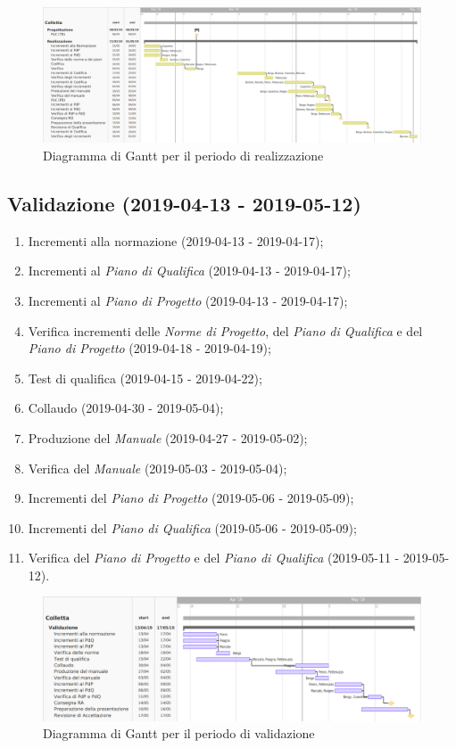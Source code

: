 	\newpage
	\begin{figure}[!hbtp]
		\centering
		\includegraphics[scale=0.5, angle=90]{images/ganttreal.png}
		\caption{Diagramma di Gantt per il periodo di realizzazione}
	\end{figure}
	
	\newpage
	
	\subsection{Validazione (2019-04-13 - 2019-05-12)}
		\begin{enumerate}[label= 5.\arabic*)]
			\item Incrementi alla normazione (2019-04-13 - 2019-04-17);
			\item Incrementi al \textit{Piano di Qualifica} (2019-04-13 - 2019-04-17);
			\item Incrementi al \textit{Piano di Progetto} (2019-04-13 - 2019-04-17);
			\item Verifica incrementi delle \textit{Norme di Progetto}, del \textit{Piano di Qualifica} e del \textit{Piano di Progetto} (2019-04-18 - 2019-04-19);
			\item Test di qualifica (2019-04-15 - 2019-04-22);
			\item Collaudo (2019-04-30 - 2019-05-04);
			\item Produzione del \textit{Manuale} (2019-04-27 - 2019-05-02);
			\item Verifica del \textit{Manuale} (2019-05-03 - 2019-05-04);
			\item Incrementi del \textit{Piano di Progetto} (2019-05-06 - 2019-05-09);
			\item Incrementi del \textit{Piano di Qualifica} (2019-05-06 - 2019-05-09);
			\item Verifica del \textit{Piano di Progetto} e del \textit{Piano di Qualifica} (2019-05-11 - 2019-05-12).
		\end{enumerate}

		\begin{figure}[!hbtp]
		\centering
		\includegraphics[scale=0.5, angle=90]{images/ganttval.png}
		\caption{Diagramma di Gantt per il periodo di validazione}
	\end{figure}
		\newpage